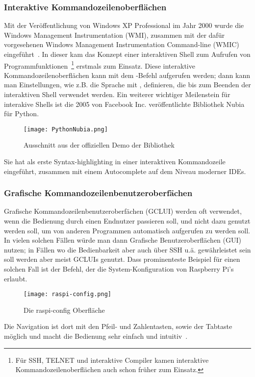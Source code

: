 \subsubsection{Interaktive Kommandozeilenoberflächen}
Mit der Veröffentlichung von Windows XP Professional im Jahr 2000 wurde die Windows Management Instrumentation (WMI),
zusammen mit der dafür vorgesehenen Windows Management Instrumentation Command-line (WMIC) eingeführt~\cite{WMIProgrammingBlogPost}.
In dieser kam das Konzept einer interaktiven Shell zum Aufrufen von
Programmfunktionen~\footnote{Für SSH, TELNET und interaktive Compiler kamen interaktive Kommandozeilenoberflächen auch schon früher zum Einsatz.} erstmals zum Einsatz.
Diese interaktive Kommandozeilenoberflächen kann mit dem -Befehl aufgerufen werden;%
dann kann man Einstellungen, wie
z.B. die Sprache mit , definieren, die bis zum Beenden der interaktiven Shell verwendet werden.
Ein weiterer wichtiger Meilenstein für interakive Shells ist die 2005 von Facebook Inc. veröffentlichte Bibliothek Nubia~\cite{NubiaReleaseBlogPost} für Python.
\begin{figure}[H]
 \texttt{[image: PythonNubia.png]}
 \caption{Ausschnitt aus der offiziellen Demo der Bibliothek}
 \label{fig:PythonNubia}
\end{figure}
Sie hat als erste Syntax-highlighting in einer interaktiven Kommandozeile eingeführt, zusammen mit einem Autocomplete auf dem Niveau moderner IDEs.
\subsubsection{Grafische Kommandozeilenbenutzeroberfächen}
Grafische Kommandozeilenbenutzeroberfächen (GCLUI) werden oft verwendet, wenn die Bedienung durch einen Endnutzer passieren soll,
und nicht dazu genutzt werden soll, um von anderen Programmen automatisch aufgerufen zu werden soll.
In vielen solchen Fällen würde man dann Grafische Benutzeroberflächen (GUI) nutzen;
in Fällen wo die Bedienbarkeit aber auch über SSH u.ä. gewährleistet sein soll werden aber meist GCLUIs genutzt.
Dass prominenteste Beispiel für einen solchen Fall ist der  Befehl, der die System-Konfiguration von Raspberry Pi's erlaubt.
\begin{figure}[H]
 \texttt{[image: raspi-config.png]}
 \caption{Die raspi-config Oberfläche}
 \label{fig:raspi-config}
\end{figure}
Die Navigation ist dort mit den Pfeil- und Zahlentasten, sowie der Tabtaste möglich und macht die Bedienung sehr einfach und intuitiv~\cite{RaspiConfigOfficialInfo}.
